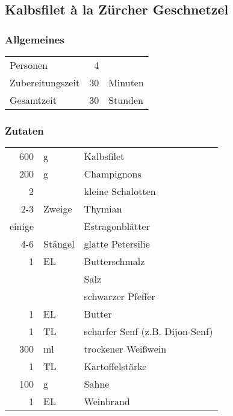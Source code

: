 \subsection{Kalbsfilet à la Zürcher Geschnetzel}
\subsubsection*{Allgemeines}
\begin{tabular}{lrl}
	Personen         &  4 &  \\
	Zubereitungszeit & 30 & Minuten \\
	Gesamtzeit       & 30 & Stunden \\
\end{tabular} 

\subsubsection*{Zutaten}
\begin{tabular}{rll}
	600    & g       & Kalbsfilet                      \\
	200    & g       & Champignons                     \\
	2      &         & kleine Schalotten               \\
	2-3    & Zweige  & Thymian                         \\
	einige &         & Estragonblätter                 \\
	4-6    & Stängel & glatte Petersilie               \\
	1      & EL      & Butterschmalz                   \\
	&         & Salz                            \\
	&         & schwarzer Pfeffer               \\
	1      & EL      & Butter                          \\
	1      & TL      & scharfer Senf (z.B. Dijon-Senf) \\
	300    & ml      & trockener Weißwein              \\
	1      & TL      & Kartoffelstärke                 \\
	100    & g       & Sahne                           \\
	1      & EL      & Weinbrand                       \\
\end{tabular} 
